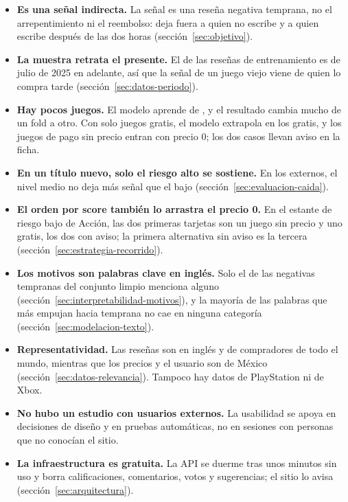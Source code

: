 \begin{itemize}
  \item \textbf{Es una señal indirecta.} La señal es una reseña negativa temprana, no el arrepentimiento ni el
  reembolso: deja fuera a quien no escribe y a quien escribe después de las dos horas
  (sección~\ref{sec:objetivo}).
  \item \textbf{La muestra retrata el presente.} El \cifraDesdeJulioEntrenamientoPorResena{} de las
  reseñas de entrenamiento es de julio de 2025 en adelante, así que la señal de un juego viejo viene
  de quien lo compra tarde (sección~\ref{sec:datos-periodo}).
  \item \textbf{Hay pocos juegos.} El modelo aprende de \cifraJuegosEntrenamiento{}, y el resultado
  cambia mucho de un fold a otro. Con solo \cifraGratisEntrenamiento{} juegos gratis, el modelo
  extrapola en los gratis, y los \cifraPagoSinPrecioEntrenamiento{} juegos de pago sin precio
  entran con precio 0; los dos casos llevan aviso en la ficha.
  \item \textbf{En un título nuevo, solo el riesgo alto se sostiene.} En los externos, el nivel medio
  no deja más señal que el bajo (sección~\ref{sec:evaluacion-caida}).
  \item \textbf{El orden por score también lo arrastra el precio 0.} En el estante de riesgo bajo de
  Acción, las dos primeras tarjetas son un juego sin precio y uno gratis, los dos con aviso; la
  primera alternativa sin aviso es la tercera (sección~\ref{sec:estrategia-recorrido}).
  \item \textbf{Los motivos son palabras clave en inglés.} Solo el \cifraCoberturaMotivosPorResena{}
  de las \cifraNegativasTempranasLimpias{} negativas tempranas del conjunto limpio menciona alguno
  (sección~\ref{sec:interpretabilidad-motivos}), y la mayoría de las palabras que más empujan hacia
  temprana no cae en ninguna categoría (sección~\ref{sec:modelacion-texto}).
  \item \textbf{Representatividad.} Las reseñas son en inglés y de compradores de todo el mundo,
  mientras que los precios y el usuario son de México (sección~\ref{sec:datos-relevancia}). Tampoco
  hay datos de PlayStation ni de Xbox.
  \item \textbf{No hubo un estudio con usuarios externos.} La usabilidad se apoya en decisiones de
  diseño y en pruebas automáticas, no en sesiones con personas que no conocían el sitio.
  \item \textbf{La infraestructura es gratuita.} La API se duerme tras unos minutos sin uso y borra
  calificaciones, comentarios, votos y sugerencias; el sitio lo avisa (sección~\ref{sec:arquitectura}).
\end{itemize}

